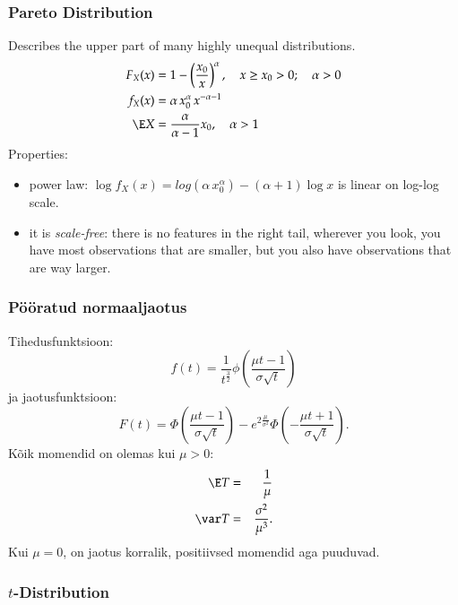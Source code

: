 \documentclass[a4paper]{article}
\numberwithin{equation}{subsection}
\begin{document}
\subsubsection{Pareto Distribution}
Describes the upper part of many highly unequal distributions. 
\begin{align}
F_X (x) 
&= 
1 - \left( \frac{x_0}{x} \right)^\alpha, 
\quad x \ge x_0 > 0; \quad \alpha > 0
\\
f_{X}(x) &=
\alpha \, x_{0}^{\alpha} \, x^{-\alpha-1}
\\
\E X &=
\frac{\alpha}{\alpha - 1} x_{0},
\quad \alpha > 1
\end{align}
Properties:
\begin{itemize}
\item power law:
  \begin{math}
    \log f_{X}(x) 
    = 
    log \left( \alpha \, x_{0}^{\alpha} \right)
    -(\alpha + 1) \log x
  \end{math}
  is linear on log-log scale.
\item it is \emph{scale-free}: there is no features in the right tail,
  wherever you look, you have most observations that are smaller, but
  you also have observations that are way larger.
\end{itemize}


\subsubsection{Pööratud normaaljaotus}
Tihedusfunktsioon:
\begin{equation}
f(t) = \frac{1}{t^\frac{3}{2}}
  \phi \left( \frac{ \mu t - 1}{\sigma\sqrt{t}} \right)
\end{equation}
ja jaotusfunktsioon:
\begin{equation}
F(t) = 
  \Phi \left( \frac{\mu t -1}{\sigma\sqrt{t}} \right) -
  e^{2\frac{\mu}{\sigma^2}}
    \Phi \left( - \frac{\mu t+1}{\sigma \sqrt{t}} \right).
\end{equation}
Kõik momendid on olemas kui $\mu>0$:
\begin{eqnarray}
\E T &=& \frac{1}{\mu} \\
\var T &=& \frac{\sigma^2}{\mu^3}.
\end{eqnarray}
Kui $\mu=0$, on jaotus korralik, positiivsed momendid aga puuduvad.  


\subsubsection{$t$-Distribution}
\label{sec:t-distribution}
\end{document}
